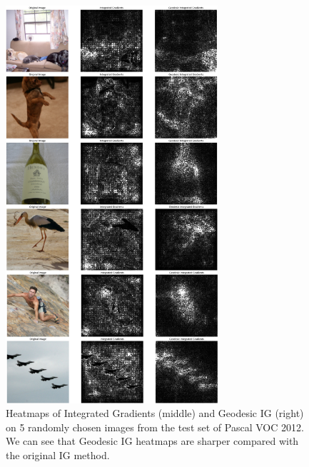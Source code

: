 \begin{figure}[ht]
\vskip 0.2in
\begin{center}
\centerline{\includegraphics[width=0.7\textwidth]{figures/more_images.png}}
\caption{Heatmaps of Integrated Gradients (middle) and Geodesic IG (right) on 5 randomly chosen images from the test set of Pascal VOC 2012. We can see that Geodesic IG heatmaps are sharper compared with the original IG method.}
\label{fig:more_images}
\end{center}
\vskip -0.2in
\end{figure}
